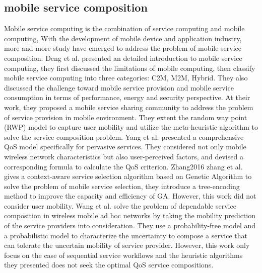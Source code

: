\documentclass[10pt,journal,compsoc]{IEEEtran}
\begin{document}
\subsection{mobile service composition}
Mobile service computing is the combination of service computing and mobile computing, With the development of mobile device and application industry, more and more study have emerged to address the problem of mobile service composition. 
Deng et al. \cite{Deng2016} presented an detailed introduction to mobile service computing, they first discussed the limitations of mobile computing, then classify mobile service computing into three categories: C2M, M2M, Hybrid. They also discussed the challenge toward mobile service provision and mobile service consumption in terms of performance, energy and security perspective. At their \cite{Deng2017} work, they proposed a mobile service sharing community to address the problem of service provision in mobile environment. They extent the random way point (RWP) model to capture user mobility and utilize the meta-heuristic algorithm to solve the service composition problem. Yang et al. \cite{Yang2010} presented a comprehensive QoS model specifically for pervasive services. They considered not only mobile wireless network characteristics but also user-perceived factors, and devised a corresponding formula to calculate the QoS criterion. 
Zhang2016
zhang et al. \cite{Zhang2016qos} gives a context-aware service selection algorithm based on Genetic Algorithm to solve the problem of mobile service selection, they introduce a tree-encoding method to improve the capacity and efficiency of GA. However, this work did not consider user mobility.
Wang et al. \cite{wang2011exploiting} solve the problem of dependable service composition in wireless mobile ad hoc networks by taking the mobility prediction of the service providers into consideration.
They use a probability-free model and a probabilistic model to characterize the uncertainty to compose a service that can tolerate the uncertain mobility of service provider. However, this work only focus on the case of sequential service workflows and the heuristic algorithms they presented does not seek the optimal QoS service compositions.
\end{document}
